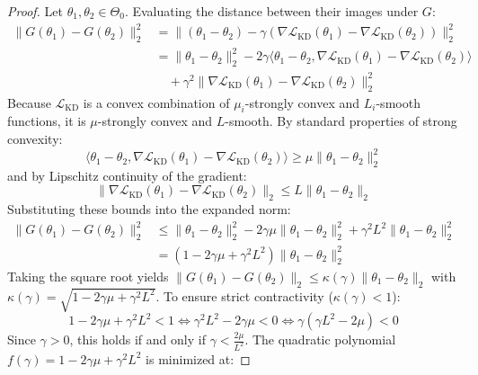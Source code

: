 \documentclass{article}
\begin{document}
\begin{proof}
Let $\theta_1, \theta_2 \in \Theta_0$. Evaluating the distance between their images under $G$:
\begin{align}
    \|G(\theta_1) - G(\theta_2)\|_2^2 &= \|(\theta_1 - \theta_2) - \gamma (\nabla \mathcal{L}_{\text{KD}}(\theta_1) - \nabla \mathcal{L}_{\text{KD}}(\theta_2))\|_2^2 \nonumber \\
    &= \|\theta_1 - \theta_2\|_2^2 - 2 \gamma \langle \theta_1 - \theta_2, \nabla \mathcal{L}_{\text{KD}}(\theta_1) - \nabla \mathcal{L}_{\text{KD}}(\theta_2) \rangle \nonumber \\
    &\quad + \gamma^2 \|\nabla \mathcal{L}_{\text{KD}}(\theta_1) - \nabla \mathcal{L}_{\text{KD}}(\theta_2)\|_2^2
\end{align}
Because $\mathcal{L}_{\text{KD}}$ is a convex combination of $\mu_i$-strongly convex and $L_i$-smooth functions, it is $\mu$-strongly convex and $L$-smooth. By standard properties of strong convexity:
\begin{equation}
    \langle \theta_1 - \theta_2, \nabla \mathcal{L}_{\text{KD}}(\theta_1) - \nabla \mathcal{L}_{\text{KD}}(\theta_2) \rangle \ge \mu \|\theta_1 - \theta_2\|_2^2
\end{equation}
and by Lipschitz continuity of the gradient:
\begin{equation}
    \|\nabla \mathcal{L}_{\text{KD}}(\theta_1) - \nabla \mathcal{L}_{\text{KD}}(\theta_2)\|_2 \le L \|\theta_1 - \theta_2\|_2
\end{equation}
Substituting these bounds into the expanded norm:
\begin{align}
    \|G(\theta_1) - G(\theta_2)\|_2^2 &\le \|\theta_1 - \theta_2\|_2^2 - 2 \gamma \mu \|\theta_1 - \theta_2\|_2^2 + \gamma^2 L^2 \|\theta_1 - \theta_2\|_2^2 \nonumber \\
    &= (1 - 2 \gamma \mu + \gamma^2 L^2) \|\theta_1 - \theta_2\|_2^2
\end{align}
Taking the square root yields $\|G(\theta_1) - G(\theta_2)\|_2 \le \kappa(\gamma) \|\theta_1 - \theta_2\|_2$ with $\kappa(\gamma) = \sqrt{1 - 2 \gamma \mu + \gamma^2 L^2}$.
To ensure strict contractivity ($\kappa(\gamma) < 1$):
\begin{equation}
    1 - 2 \gamma \mu + \gamma^2 L^2 < 1 \iff \gamma^2 L^2 - 2 \gamma \mu < 0 \iff \gamma (\gamma L^2 - 2 \mu) < 0
\end{equation}
Since $\gamma > 0$, this holds if and only if $\gamma < \frac{2\mu}{L^2}$.
The quadratic polynomial $f(\gamma) = 1 - 2 \gamma \mu + \gamma^2 L^2$ is minimized at:

\end{proof}
\end{document}
